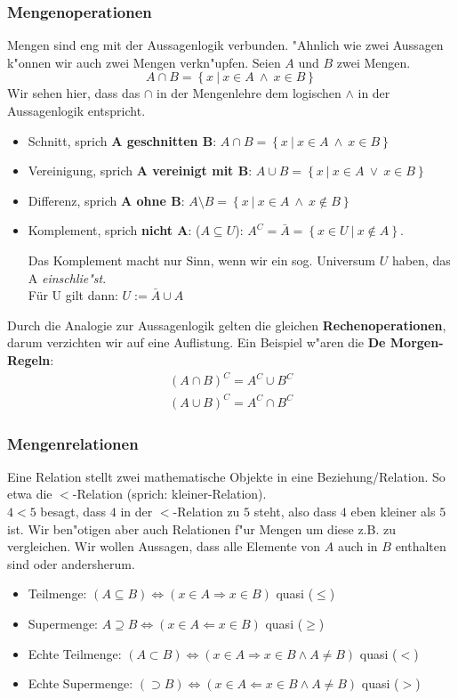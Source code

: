 \subsubsection{Mengenoperationen}
Mengen sind eng mit der Aussagenlogik verbunden. "Ahnlich wie zwei Aussagen k"onnen wir auch zwei Mengen verkn"upfen. Seien $A$ und $B$ zwei Mengen.
\begin{equation*}
A \cap B = \left\{ x \ | \ x \in A \ \land \ x \in B \right\}
\end{equation*}
Wir sehen hier, dass das $\cap$ in der Mengenlehre dem logischen $\land$ in der Aussagenlogik entspricht.
\begin{itemize}
\item Schnitt, sprich \textbf{A geschnitten B}: $A \cap B =  \left\{x \ | \ x \in A \ \land \ x \in B \right\}$
\item Vereinigung, sprich \textbf{A vereinigt mit B}: $A \cup B =  \left\{x \ | \ x \in A \ \lor \ x \in B \right\}$
\item Differenz, sprich \textbf{A ohne B}: $A \setminus B =  \left\{x \ | \ x \in A \ \land \ x \notin B \right\}$
\item Komplement, sprich \textbf{nicht A}: ($A \subseteq U$): $A^C = \bar{A} = \left\{x \in U \ | \ x \notin A \right\}$.
\begin{warning}
	Das Komplement macht nur Sinn, wenn wir ein sog. Universum $U$ haben, das A \textit{einschlie"st}.\\
	Für U gilt dann: $U := \bar{A} \cup A$
\end{warning}
\end{itemize}
Durch die Analogie zur Aussagenlogik gelten die gleichen \textbf{Rechenoperationen}, darum verzichten wir auf eine Auflistung. Ein Beispiel w"aren die \textbf{De Morgen-Regeln}:
\begin{gather*}
(A \cap B)^C = A^C \cup B^C \\
(A \cup B)^C = A^C \cap B^C 
\end{gather*} 

\subsubsection{Mengenrelationen}
Eine Relation stellt zwei mathematische Objekte in eine Beziehung/Relation. So etwa die $<$-Relation (sprich: kleiner-Relation).\\
$4 < 5$ besagt, dass $4$ in der $<$-Relation zu $5$ steht, also dass $4$ eben kleiner als $5$ ist. Wir ben"otigen aber auch Relationen f"ur Mengen um diese z.B. zu vergleichen. Wir wollen Aussagen, dass alle Elemente von $A$ auch in $B$ enthalten sind oder andersherum.
\begin{itemize}
\item Teilmenge: $(A \subseteq B) \iff (x \in A \Rightarrow x \in B)$ quasi ($\leq$)
\item Supermenge: $A \supseteq B  \iff (x \in A \Leftarrow x \in B)$ quasi ($\geq$)
\item Echte Teilmenge: $(A \subset B) \iff (x \in A \Rightarrow x \in B \land A \neq B)$ quasi ($<$)
\item Echte Supermenge: $(\supset B) \iff (x \in A \Leftarrow x \in B \land A \neq B)$ quasi ($>$)
\end{itemize}

